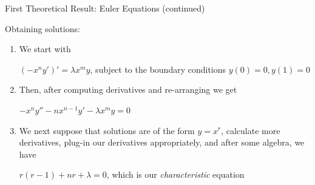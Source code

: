 \documentclass{beamer}
\begin{document}
\begin{frame}{First Theoretical Result: Euler Equations (continued)}

Obtaining solutions:

\begin{enumerate}

\item We start with

\begin{center}

\begin{varblock}[12cm]

$(-x^ny')'=\lambda x^my$, subject to the boundary conditions $y(0)=0, y(1)=0$

\end{varblock}

\end{center}

\item Then, after computing derivatives and re-arranging we get

\begin{center}

\begin{minipage}{5cm}

\begin{varblock}[5cm]

$-x^ny''-nx^{n-1}y'-\lambda x^my=0$

\end{varblock}

\end{minipage}

\end{center}

\item We next suppose that solutions are of the form $y=x^r$, calculate more derivatives, plug-in our derivatives appropriately, and after some algebra, we have

\begin{center}

\begin{minipage}{10cm}

\begin{varblock}[10cm]

$r(r-1)+nr+\lambda=0$, which is our \textit{characteristic} equation

\end{varblock}

\end{minipage}

\end{center}

\asuivre

\end{enumerate}

\end{frame}
\end{document}
